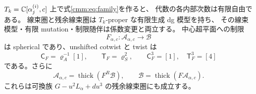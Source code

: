 \begin{proposition}[全係数での中心超平面制限]
\label{cmm:prop:universal-spherical}
$T_k=\mathbb C[\alpha^{(i)}_j,c]$ 上で式\eqref{cmm:eq:family}を作ると、
代数の各内部次数は有限自由である。
線束圏と残余線束圏は $T_k$-proper な有限生成 dg 模型を持ち、
その線束模型・有限 mutation・制限随伴は係数変更と両立する。
中心超平面への制限
\[
 F_{\alpha,c}:\mathcal A_{\alpha,c}\longrightarrow\mathcal B
\]
は spherical であり、unshifted cotwist と twist は
\[
 \mathsf C_F=\varrho_A^{-1}[1],\qquad
 \mathsf T_F=\varrho_S^2,
 \qquad \mathsf C_F^3=[1],\quad\mathsf T_F^3=[4]
\]
である。さらに
\[
 \mathcal A_{\alpha,c}=\operatorname{thick}(F^R\mathcal B),\qquad
 \mathcal B=\operatorname{thick}(F\mathcal A_{\alpha,c}).
\]
これらは可換族 $G-u^2L_\alpha+du^3$ の残余線束圏にも成立する。
\end{proposition}

